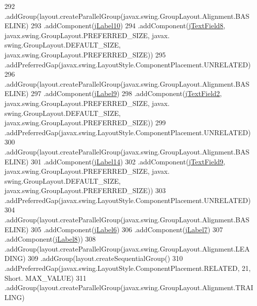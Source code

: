 \begin{DoxyCode}
292                 .addGroup(layout.createParallelGroup(javax.swing.GroupLayout.Alignment.BASELINE)
293                     .addComponent(\mbox{\hyperlink{classsoftware_1_1parasoftware3_ac2e16b2c38aefb461c2f0eced858c1fd}{jLabel10}})
294                     .addComponent(\mbox{\hyperlink{classsoftware_1_1parasoftware3_a1be214ec91e03d8a319ac31581cd559f}{jTextField8}}, javax.swing.GroupLayout.PREFERRED\_SIZE, javax.
      swing.GroupLayout.DEFAULT\_SIZE, javax.swing.GroupLayout.PREFERRED\_SIZE))
295                 .addPreferredGap(javax.swing.LayoutStyle.ComponentPlacement.UNRELATED)
296                 .addGroup(layout.createParallelGroup(javax.swing.GroupLayout.Alignment.BASELINE)
297                     .addComponent(\mbox{\hyperlink{classsoftware_1_1parasoftware3_ac84a161604551842c24b960457e78a4e}{jLabel9}})
298                     .addComponent(\mbox{\hyperlink{classsoftware_1_1parasoftware3_a420e41087126364b3392b21a69724347}{jTextField2}}, javax.swing.GroupLayout.PREFERRED\_SIZE, javax.
      swing.GroupLayout.DEFAULT\_SIZE, javax.swing.GroupLayout.PREFERRED\_SIZE))
299                 .addPreferredGap(javax.swing.LayoutStyle.ComponentPlacement.UNRELATED)
300                 .addGroup(layout.createParallelGroup(javax.swing.GroupLayout.Alignment.BASELINE)
301                     .addComponent(\mbox{\hyperlink{classsoftware_1_1parasoftware3_a8cf21f19b1d00a92b53875d6c27aed2f}{jLabel14}})
302                     .addComponent(\mbox{\hyperlink{classsoftware_1_1parasoftware3_a9fe814b0f2e84f9047438996abdea4a3}{jTextField9}}, javax.swing.GroupLayout.PREFERRED\_SIZE, javax.
      swing.GroupLayout.DEFAULT\_SIZE, javax.swing.GroupLayout.PREFERRED\_SIZE))
303                 .addPreferredGap(javax.swing.LayoutStyle.ComponentPlacement.UNRELATED)
304                 .addGroup(layout.createParallelGroup(javax.swing.GroupLayout.Alignment.BASELINE)
305                     .addComponent(\mbox{\hyperlink{classsoftware_1_1parasoftware3_a4afbf232c47d3ab6c0aaf0ae394219bf}{jLabel6}})
306                     .addComponent(\mbox{\hyperlink{classsoftware_1_1parasoftware3_a244f99c3af34ae7b3a9046d6efc18a95}{jLabel7}})
307                     .addComponent(\mbox{\hyperlink{classsoftware_1_1parasoftware3_aa6b9c08a2dd3c58649ccab6707950e45}{jLabel8}}))
308                 .addGroup(layout.createParallelGroup(javax.swing.GroupLayout.Alignment.LEADING)
309                     .addGroup(layout.createSequentialGroup()
310                         .addPreferredGap(javax.swing.LayoutStyle.ComponentPlacement.RELATED, 21, Short.
      MAX\_VALUE)
311                         .addGroup(layout.createParallelGroup(javax.swing.GroupLayout.Alignment.TRAILING)

\end{DoxyCode}
